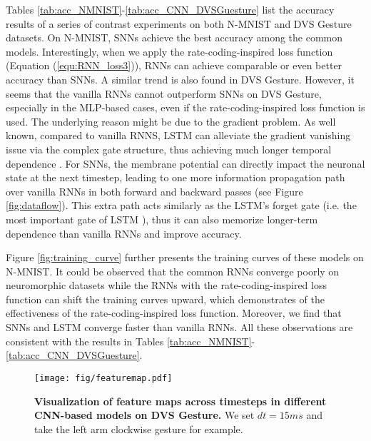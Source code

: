 \documentclass[journal,10pt,twocolumn]{IEEETran}
\begin{document}
Tables \ref{tab:acc_NMNIST}-\ref{tab:acc_CNN_DVSGuesture} list the accuracy results of a series of contrast experiments on both N-MNIST and DVS Gesture datasets. On N-MNIST, SNNs achieve the best accuracy among the common models. Interestingly, when we apply the rate-coding-inspired loss function (Equation (\ref{equ:RNN_loss3})), RNNs can achieve comparable or even better accuracy than SNNs. A similar trend is also found in DVS Gesture. However, it seems that the vanilla RNNs cannot outperform SNNs on DVS Gesture, especially in the MLP-based cases, even if the rate-coding-inspired loss function is used. The underlying reason might be due to the gradient problem. As well known, compared to vanilla RNNS, LSTM can alleviate the gradient vanishing issue via the complex gate structure, thus achieving much longer temporal dependence \cite{hochreiter1997long,gers1999learning}. For SNNs, the membrane potential can directly impact the neuronal state at the next timestep, leading to one more information propagation path over vanilla RNNs in both forward and backward passes (see Figure \ref{fig:dataflow}). This extra path acts similarly as the LSTM's forget gate (i.e. the most important gate of LSTM \cite{jozefowicz2015empirical}), thus it can also memorize longer-term dependence than vanilla RNNs and improve accuracy.

Figure \ref{fig:training_curve} further presents the training curves of these models on N-MNIST. It could be observed that the common RNNs converge poorly on neuromorphic datasets while the RNNs with the rate-coding-inspired loss function can shift the training curves upward, which demonstrates of the effectiveness of the rate-coding-inspired loss function. Moreover, we find that SNNs and LSTM converge faster than vanilla RNNs. All these observations are consistent with the results in Tables \ref{tab:acc_NMNIST}-\ref{tab:acc_CNN_DVSGuesture}. 

\begin{figure}[!htbp]
\centering     
\texttt{[image: fig/featuremap.pdf]}
\caption{\textbf{Visualization of feature maps across timesteps in different CNN-based models on DVS Gesture.} We set $dt=15ms$ and take the left arm clockwise gesture for example.} \label{fig:FM} 
\end{figure}
\end{document}
